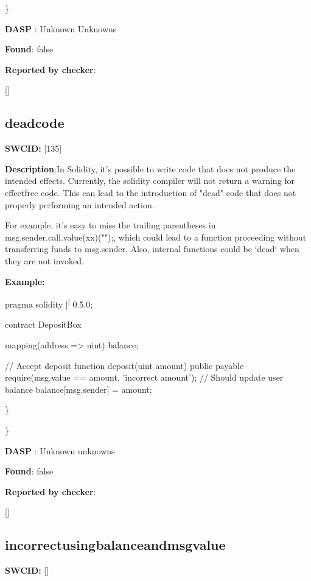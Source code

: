 \documentclass{article}
\begin{document}
\} 

\textbf{DASP} : Unknown Unknowns

\textbf{Found}: false

\textbf{Reported by checker}: 
\begin{ffcode} 

[]
\end{ffcode} 
\subsection{dead{\textunderscore}code} 
\textbf{SWC{\textunderscore}ID:} [135]

\textbf{Description}:In Solidity, it's possible to write code that does not produce the intended effects. Currently, the solidity compiler will not return a warning for effect{\textendash}free code. This can lead to the introduction of "dead" code that does not properly performing an intended action.

For example, it's easy to miss the trailing parentheses in msg.sender.call.value(xx)("");, which could lead to a function proceeding without transferring funds to msg.sender. Also, internal functions could be `dead` when they are not invoked.


\textbf{Example:} 
\begin{ffcode} 

pragma solidity |\textsuperscript| 0.5.0;

contract DepositBox {
    mapping(address => uint) balance;

    // Accept deposit
    function deposit(uint amount) public payable {
        require(msg.value == amount, 'incorrect amount');
        // Should update user balance
        balance[msg.sender] = amount;
    }
}

\end{ffcode} 
\} 

\} 

\textbf{DASP} : Unknown unknowns

\textbf{Found}: false

\textbf{Reported by checker}: 
\begin{ffcode} 

[]
\end{ffcode} 
\subsection{incorrect{\textunderscore}using{\textunderscore}balance{\textunderscore}and{\textunderscore}msg{\textunderscore}value} 
\textbf{SWC{\textunderscore}ID:} []
\end{document}
